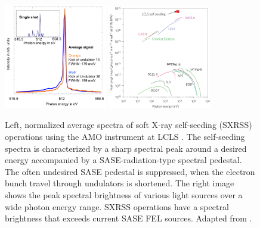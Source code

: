 \begin{figure}
	\centering
		\includegraphics[width=0.40\textwidth]{images/Soft-X-ray-self-seeding.pdf}
		\includegraphics[width=0.40\textwidth]{images/spectral-brightness-fletcher-2015-corr.jpg}
	\caption[Soft X-ray self-seeding spectra and brilliance of various lightsources.]{Left, normalized average spectra of soft X-ray self-seeding (SXRSS) operations using the AMO instrument at LCLS \citep[see][]{Bucher-2014-Unpublished}. The self-seeding spectra is characterized by a sharp spectral peak around a desired energy accompanied by a SASE-radiation-type spectral pedestal. The often undesired SASE pedestal is suppressed, when the electron bunch travel through undulators is shortened. The right image shows the peak spectral brightness of various light sources over a wide photon energy range. SXRSS operations have a spectral brightness that exceeds current SASE FEL sources. Adapted from \citep{Fletcher-2015-NatPho}.}
	\label{fig:soft-xray-self-seeding}
\end{figure}
%

